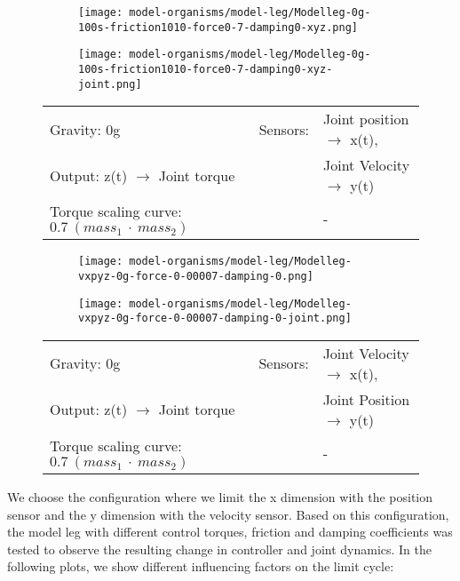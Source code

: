 \documentclass[main]{subfiles}
\begin{document}
\begin{figure}[H]
	\centering
		\begin{subfigure}[c]{0.45\textwidth}
	\texttt{[image: model-organisms/model-leg/Modelleg-0g-100s-friction1010-force0-7-damping0-xyz.png]}
		\end{subfigure}
	\begin{subfigure}[c]{0.45\textwidth}
	\texttt{[image: model-organisms/model-leg/Modelleg-0g-100s-friction1010-force0-7-damping0-xyz-joint.png]}
		\end{subfigure}
	\caption[Limited chaotic controller controlling model leg]{}
	\begin{tabular}{l|ll}
	\hline 
	Gravity: 0g  & Sensors: & Joint position \(\rightarrow\) x(t),\\
	 Output: z(t) \(\rightarrow\) Joint torque &  & Joint Velocity \(\rightarrow\) y(t) \\
	  Torque scaling curve: \(0.7~(mass_1~\cdot~mass_2)\) & & - \\
	  \hline
	\end{tabular}

	\label{figure:limited-model-leg5}
\end{figure}

\begin{figure}[H]
	\centering
		\begin{subfigure}[c]{0.45\textwidth}
	\texttt{[image: model-organisms/model-leg/Modelleg-vxpyz-0g-force-0-00007-damping-0.png]}
		\end{subfigure}
	\begin{subfigure}[c]{0.45\textwidth}
	\texttt{[image: model-organisms/model-leg/Modelleg-vxpyz-0g-force-0-00007-damping-0-joint.png]}
		\end{subfigure}
	\caption[Limited chaotic controller controlling model leg]{}
	\begin{tabular}{l|ll}
	\hline 
	Gravity: 0g  & Sensors: & Joint Velocity \(\rightarrow\) x(t),\\
	 Output: z(t) \(\rightarrow\) Joint torque & & Joint Position \(\rightarrow\) y(t) \\
	  Torque scaling curve: \(0.7~(mass_1~\cdot~mass_2)\) & & - \\
	  \hline
	\end{tabular}

	\label{figure:limited-model-leg6}
\end{figure}

We choose the configuration where we limit the x dimension with the position sensor and the y dimension with the velocity sensor. %
%
Based on this configuration, the model leg with different control torques, friction and damping coefficients was tested to observe the resulting change in controller and joint dynamics. %
%
In the following plots, we show different influencing factors on the limit cycle:
\end{document}
